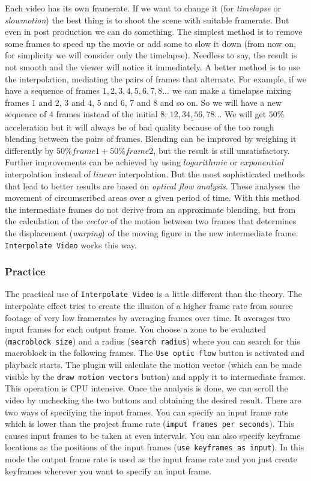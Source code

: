 Each video has its own framerate. If we want to change it (for \textit{timelapse} or \textit{slowmotion}) the best thing is to shoot the scene with suitable framerate. But even in post production we can do something. The simplest method is to remove some frames to speed up the movie or add some to slow it down (from now on, for simplicity we will consider only the timelapse). Needless to say, the result is not smooth and the viewer will notice it immediately. A better method is to use the interpolation, mediating the pairs of frames that alternate. For example, if we have a sequence of frames $1, 2, 3, 4, 5, 6, 7, 8\dots$ we can make a timelapse mixing frames $1$ and $2$, $3$ and $4$, $5$ and $6$, $7$ and $8$ and so on. So we will have a new sequence of $4$ frames instead of the initial $8$: $\underline{12, 34, 56, 78}\dots$ We will get $50\%$ acceleration but it will always be of bad quality because of the too rough blending between the pairs of frames. Blending can be improved by weighing it differently by $50\% frame 1 + 50\% frame 2$, but the result is still unsatisfactory. Further improvements can be achieved by using $logarithmic$ or $exponential$ interpolation instead of $linear$ interpolation. But the most sophisticated methods that lead to better results are based on \textit{optical flow analysis}. These analyses the movement of circumscribed areas over a given period of time. With this method the intermediate frames do not derive from an approximate blending, but from the calculation of the \textit{vector} of the motion between two frames that determines the displacement (\textit{warping}) of the moving figure in the new intermediate frame. \texttt{Interpolate Video} works this way.

\subsubsection*{Practice}
\label{ssub:practice}

The practical use of \texttt{Interpolate Video} is a little different than the theory. The interpolate effect tries to create the illusion of a higher frame rate from source footage of very low framerates by averaging frames over time. It averages two input frames for each output frame. You choose a zone to be evaluated (\texttt{macroblock size}) and a radius (\texttt{search radius}) where you can search for this macroblock in the following frames. The \texttt{Use optic flow} button is activated and playback starts. The plugin will calculate the motion vector (which can be made visible by the \texttt{draw motion vectors} button) and apply it to intermediate frames. This operation is CPU intensive. Once the analysis is done, we can scroll the video by unchecking the two buttons and obtaining the desired result. There are two ways of specifying the input frames. You can specify an input frame rate which is lower than the project frame rate (\texttt{imput frames per seconds}). This causes input frames to be taken at even intervals. You can also specify keyframe locations as the positions of the input frames (\texttt{use keyframes as input}). In this mode the output frame rate is used as the input frame rate and you just create keyframes wherever you want to specify an input frame.

